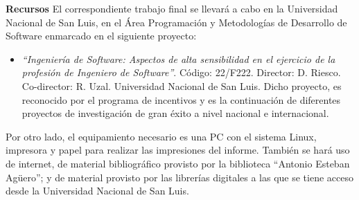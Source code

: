 \documentclass[a4paper,12pt]{article}
\begin{document}
\pagebreak

{\Large \textbf{Recursos}}
\vskip0.5cm
\hspace{0.5cm}El correspondiente trabajo final se llevará a cabo en la Universidad Nacional de San Luis, en el Área Programación y Metodologías de Desarrollo de Software enmarcado en el siguiente proyecto:

\begin{itemize}
\renewcommand{\labelitemi}{$\diamondsuit$}%

\item \textit{“Ingeniería de Software: Aspectos de alta sensibilidad en el ejercicio de la profesión de Ingeniero de Software”}. Código: 22/F222. Director: D. Riesco. Co-director: R. Uzal. Universidad 
Nacional de San Luis. 
Dicho proyecto, es reconocido por el programa de incentivos y es la continuación de 
diferentes proyectos de investigación de gran éxito a nivel nacional e internacional.
 

\end{itemize}


\hspace{0.5cm}Por otro lado, el equipamiento necesario es una PC con el sistema Linux, impresora y papel para realizar las impresiones del informe. También se hará uso de internet, de material bibliográfico provisto por la biblioteca “Antonio Esteban Agüero”; y  de material provisto por las librerías digitales a las que se tiene acceso desde la Universidad Nacional de San Luis.


\end{document}
